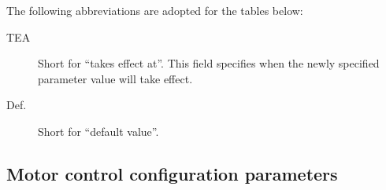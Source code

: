 \documentclass{zubaxdoc}
\begin{document}
The following abbreviations are adopted for the tables below:
\begin{description}
\item[TEA] Short for ``takes effect at''. This field specifies when the newly specified parameter value will
take effect.
\item[Def.] Short for ``default value''.
\end{description}

\newcommand\CfgParamIndexEntry[7]{%
    \CfgDef{#1} & \footnotesize{#2} & \footnotesize{\CfgListReferences{#1}} & \footnotesize{#3} &
    \footnotesize{#4} & \footnotesize{#5} & \footnotesize{#6} &
    \footnotesize{#7} \tabularnewline
}%

\newenvironment{CfgParamIndex}[1]{%
    \begin{ZubaxTableWrapper}{#1}
    \setlength\tabcolsep{2.5pt}
    \begin{ZubaxWrappedTable}{@{} l l l l | c c c | X @{}}
    Name & Unit & Pages & TEA & Min & Max & Def. & Description \\
}{%
    \end{ZubaxWrappedTable}
    \end{ZubaxTableWrapper}
}

\subsection{Motor control configuration parameters}
\end{document}
